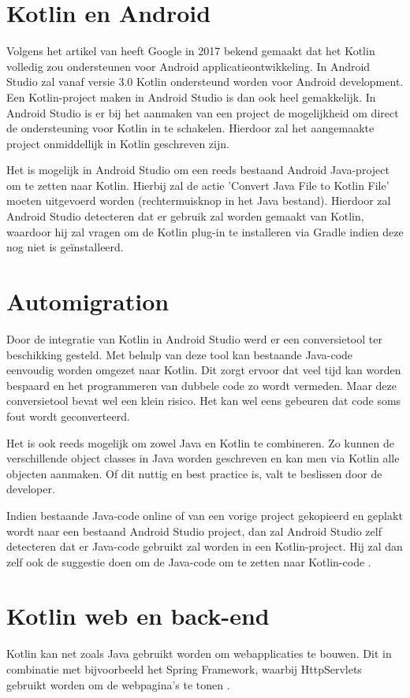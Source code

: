 \section{Kotlin en Android}
\label{sec:kotlinandroid}
Volgens het artikel van \textcite{GoogleSupportKotlin} heeft Google in 2017 bekend gemaakt dat het Kotlin volledig zou ondersteunen voor Android applicatieontwikkeling. In Android Studio zal vanaf versie 3.0 Kotlin ondersteund worden voor Android development. Een Kotlin-project maken in Android Studio is dan ook heel gemakkelijk. In Android Studio is er bij het aanmaken van een project de mogelijkheid om direct de ondersteuning voor Kotlin in te schakelen. Hierdoor zal het aangemaakte project onmiddellijk in Kotlin geschreven zijn.

Het is mogelijk in Android Studio om een reeds bestaand Android Java-project om te zetten naar Kotlin. Hierbij zal de actie 'Convert Java File to Kotlin File' moeten uitgevoerd worden (rechtermuisknop in het Java bestand). Hierdoor zal Android Studio detecteren dat er gebruik zal worden gemaakt van Kotlin, waardoor hij zal vragen om de Kotlin plug-in te installeren via Gradle indien deze nog niet is geïnstalleerd.


\section{Automigration}
\label{sec:Automigration}
Door de integratie van Kotlin in Android Studio werd er een conversietool ter beschikking gesteld. Met behulp van deze tool kan bestaande Java-code eenvoudig worden omgezet naar Kotlin. Dit zorgt ervoor dat veel tijd kan worden bespaard en het programmeren van dubbele code zo wordt vermeden. Maar deze conversietool bevat wel een klein risico. Het kan wel eens gebeuren dat code soms fout wordt geconverteerd. 

Het is ook reeds mogelijk om zowel Java en Kotlin te combineren. Zo kunnen de verschillende object classes in Java worden geschreven en kan men via Kotlin alle objecten aanmaken. Of dit nuttig en best practice is, valt te beslissen door de developer.

Indien bestaande Java-code online of van een vorige project gekopieerd en geplakt wordt naar een bestaand Android Studio project, dan zal Android Studio zelf detecteren dat er Java-code gebruikt zal worden in een Kotlin-project. Hij zal dan zelf ook de suggestie doen om de Java-code om te zetten naar Kotlin-code \autocite{Avantica2017}.


\section{Kotlin web en back-end}
\label{sec:kotlincrossplatform}
Kotlin kan net zoals Java gebruikt worden om webapplicaties te bouwen. Dit in combinatie met bijvoorbeeld het Spring Framework, waarbij HttpServlets gebruikt worden om de webpagina's te tonen \autocite{JetBrainsWeb}.

